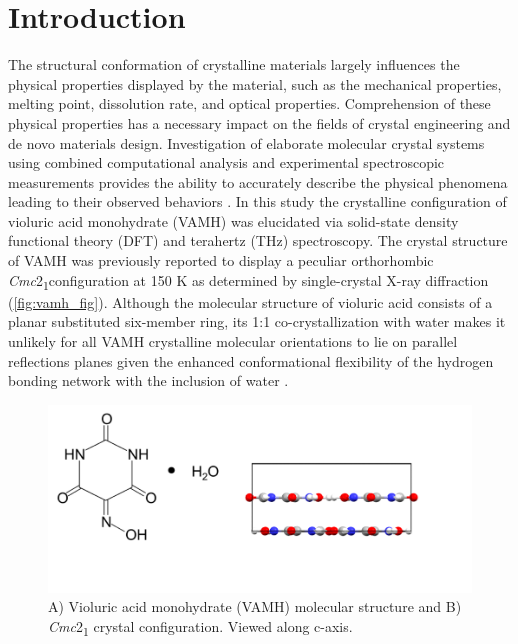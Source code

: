\section{Introduction}
The structural conformation of crystalline materials largely influences the physical properties displayed by the material, such as the mechanical properties, melting point, dissolution rate, and optical properties.\citep{Brittain2016,bernstein_polymorphism_2011,cocca_influence_2011} Comprehension of these physical properties has a necessary impact on the fields of crystal engineering and de novo materials design\citep{Lange2016,Singhal2004,Radhakrishnan2018}. Investigation of elaborate molecular crystal systems using combined computational analysis and experimental spectroscopic measurements provides the ability to accurately describe the physical phenomena leading to their observed behaviors \citep{thiago,king_identification_2011,ruggiero_predicting_2018,Hutereau2020,Hoshina2020}.
In this study the crystalline configuration of violuric acid monohydrate (VAMH) was elucidated via solid-state density functional theory (DFT) and terahertz (THz) spectroscopy. The crystal structure of VAMH was previously reported to display a peculiar orthorhombic \textit{Cmc}2\textsubscript{1}configuration at 150 K as determined by single-crystal X-ray diffraction (\autoref{fig:vamh_fig}).\citep{nichol_violuric_2005} Although the molecular structure of violuric acid consists of a planar substituted six-member ring, its 1:1 co-crystallization with water makes it unlikely for all VAMH crystalline molecular orientations to lie on parallel reflections planes given the enhanced conformational flexibility of the hydrogen bonding network with the inclusion of water \citep{Pu2010}.
  
\begin{figure}[ht!]
  \center
  \includegraphics[width=1\linewidth]{src/figures/VAMH_figures/VAMH_fig1.png}
  \caption{A) Violuric acid monohydrate (VAMH) molecular structure and B) \textit{Cmc}2\textsubscript{1} crystal configuration. Viewed along c-axis.}
  \label{fig:vamh_fig}
\end{figure}

